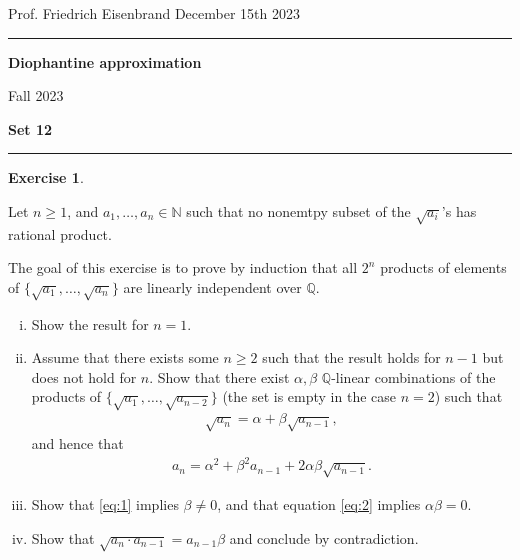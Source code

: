 \documentclass[12pt,a4paper]{article}
\date{}
\theoremstyle{plain}
\newtheorem*{Sol*}{Solution}
\theoremstyle{definition}
\newtheorem{Ex}{Exercise}
\def \N {\mathbb N}
\def \Q {\mathbb Q}
\newif\ifsolutions
\newcommand{\exercise}[2]{
			\begin{Ex} #1 \end{Ex}
			\ifsolutions  \begin{Sol*} #2 \end{Sol*} \bigskip \else \bigskip  \fi
		}
\begin{document}
\begin{center}
{Prof. Friedrich Eisenbrand \hfill December 15th 2023}
\end{center}
	
\hrule\vspace{\baselineskip}

\begin{center}
\textbf{Diophantine approximation}

Fall 2023

\bigskip

\textbf{Set 12}
\ifsolutions{\textbf{- Solutions}} \else{} \fi
\end{center}

\hrule\vspace{\baselineskip}





\exercise{\label{ex:1}

	Let $n\geq1$, and $a_1, \dots, a_n \in \N$ such that no nonemtpy subset of the $\sqrt{a_i}$'s has rational product.

	The goal of this exercise is to prove by induction that all $2^n$ products of elements of $\{ \sqrt{a_1}, \dots, \sqrt{a_n} \}$ are linearly independent over $\Q$.

	\begin{enumerate}[i)]

		\item 
		Show the result for $n=1$.

		\item Assume that there exists some $n \geq 2$ such that the result holds for $n-1$ but does not hold for $n$.
		Show that there exist $\alpha, \beta$ $\Q$-linear combinations of the products of $\{ \sqrt{a_1}, \dots, \sqrt{a_{n-2}} \}$ (the set is empty in the case $n=2$) such that
			\begin{align}\label{eq:1}
				 \sqrt{a_n} = \alpha + \beta \sqrt{a_{n-1}},
			\end{align}
		and hence that
			\begin{align}\label{eq:2}
				a_n = \alpha^2 + \beta^2 a_{n-1} + 2 \alpha \beta \sqrt{a_{n-1}}.
			\end{align}

		\item Show that \eqref{eq:1} implies $\beta \neq 0$, and that equation \eqref{eq:2} implies $\alpha\beta = 0$.

		\item Show that $\sqrt{a_n \cdot a_{n-1}} = a_{n-1} \beta$ and conclude by contradiction.
	\end{enumerate}

}{}
\end{document}
